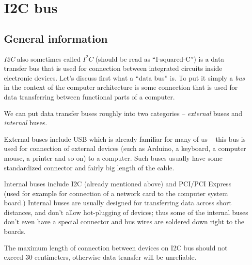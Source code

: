 \documentclass[../sparc.tex]{subfiles}
\begin{document}
\section{I2C bus}
\label{section:i2c}


\subsection{General information}

\textit{\gls{I2C}} also sometimes called $I^{2}C$ (should be read as
``I-squared-C'') is a data transfer bus that is used for connection between
integrated circuits inside electronic devices.  Let's discuss first what a
``data bus'' is.  To put it simply a \textit{bus} in the context of the computer
architecture is some connection that is used for data transferring between
functional parts of a computer.

We can put data transfer buses roughly into two categories -- \textit{external}
buses and \textit{internal} buses.

External buses include \gls{USB} which is already familiar for many of us -- this
bus is used for connection of external devices (such as Arduino, a keyboard, a
computer mouse, a printer and so on) to a computer.  Such buses usually have
some standardized connector and fairly big length of the cable.

Internal buses include \gls{I2C} (already mentioned above) and \gls{PCI}/PCI
Express (used for example for connection of a network card to the computer
system board.)  Internal buses are usually designed for transferring data across
short distances, and don't allow hot-plugging of devices; thus some of the
internal buses don't even have a special connector and bus wires are soldered
down right to the boards.

The maximum length of connection between devices on \gls{I2C} bus should not
exceed 30 centimeters, otherwise data transfer will be unreliable.
\end{document}
